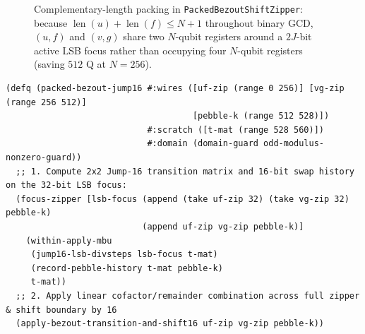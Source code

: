 \documentclass[acmsmall,screen,anonymous]{acmart}
\DeclareRobustCommand{\_}{\ifmmode\text{\char95}\else\char95\penalty0\relax\fi}
\theoremstyle{plain}
\begin{document}
\begin{figure}[t]
\centering
{}
\caption{Complementary-length packing in \texttt{PackedBezoutShiftZipper}: because $\operatorname{len}(u) + \operatorname{len}(f) \le N + 1$ throughout binary GCD, $(u, f)$ and $(v, g)$ share two $N$-qubit registers around a $2J$-bit active LSB focus rather than occupying four $N$-qubit registers (saving $512\text{ Q}$ at $N = 256$).}
\label{fig:bezout_zipper}
\end{figure}

\begin{lstlisting}[language=LakefillLisp,caption={Jump-16 packed B\'{e}zout step in \texttt{\#lang lakefillq}: non-Clifford \texttt{divsteps} touch only the $2J$-bit focus while binomial pebbles checkpoint the 16-bit swap trajectory.},label={alg:qds_fam2}]
(defq (packed-bezout-jump16 #:wires ([uf-zip (range 0 256)] [vg-zip (range 256 512)]
                                     [pebble-k (range 512 528)])
                            #:scratch ([t-mat (range 528 560)])
                            #:domain (domain-guard odd-modulus-nonzero-guard))
  ;; 1. Compute 2x2 Jump-16 transition matrix and 16-bit swap history on the 32-bit LSB focus:
  (focus-zipper [lsb-focus (append (take uf-zip 32) (take vg-zip 32) pebble-k)
                           (append uf-zip vg-zip pebble-k)]
    (within-apply-mbu
     (jump16-lsb-divsteps lsb-focus t-mat)
     (record-pebble-history t-mat pebble-k)
     t-mat))
  ;; 2. Apply linear cofactor/remainder combination across full zipper & shift boundary by 16
  (apply-bezout-transition-and-shift16 uf-zip vg-zip pebble-k))
\end{lstlisting}
\end{document}
